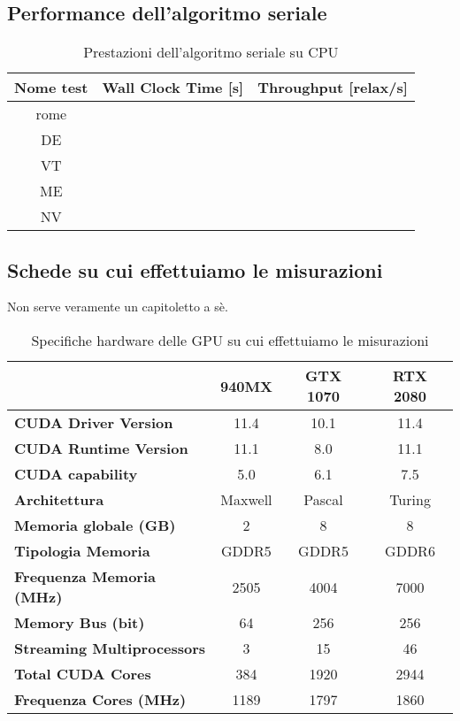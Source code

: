 \documentclass[a4paper]{article}
\begin{document}
	\subsection{Performance dell'algoritmo seriale}
	\begin{table}[!ht]
		\centering
		\begin{tabular}{|c|c|c|}
			\hline
			\textbf{Nome test} & \textbf{Wall Clock Time [s]} & \textbf{Throughput [relax/s]} \\ \hline
			       rome        &                          &                     \\ \hline
			        DE         &                          &                     \\ \hline
			        VT         &                          &                     \\ \hline
			        ME         &                          &                     \\ \hline
			        NV         &                          &                     \\ \hline
		\end{tabular}
		\label{tab:performance_serial}
		\caption{Prestazioni dell'algoritmo seriale su CPU}
	\end{table}
	
	\subsection{Schede su cui effettuiamo le misurazioni}
	Non serve veramente un capitoletto a sè.
	\begin{table}[!ht]
		\centering
		\begin{tabular}{|l|c|c|c|}
			\hline
			  & \textbf{940MX} & \textbf{GTX 1070} & \textbf{RTX 2080} \\ \hline
			\textbf{CUDA Driver Version} & 11.4 & 10.1 & 11.4 \\ \hline
			\textbf{CUDA Runtime Version} & 11.1 & 8.0 & 11.1 \\ \hline
			\textbf{CUDA capability} & 5.0 & 6.1 & 7.5 \\ \hline
			\textbf{Architettura} & Maxwell & Pascal & Turing \\ \hline
			\textbf{Memoria globale (GB)} & 2 & 8 & 8 \\ \hline
			\textbf{Tipologia Memoria} & GDDR5 & GDDR5 & GDDR6 \\ \hline
			\textbf{Frequenza Memoria (MHz)} & 2505 & 4004 & 7000 \\ \hline
			\textbf{Memory Bus (bit)} & 64 & 256 & 256 \\ \hline
			\textbf{Streaming Multiprocessors} & 3 & 15 & 46 \\ \hline
			\textbf{Total CUDA Cores} & 384 & 1920 & 2944 \\ \hline
			\textbf{Frequenza Cores (MHz)} & 1189 & 1797 & 1860 \\ \hline
		\end{tabular}
		\label{tab:specs_gpus}
		\caption{Specifiche hardware delle GPU su cui effettuiamo le misurazioni}
	\end{table}
\end{document}
